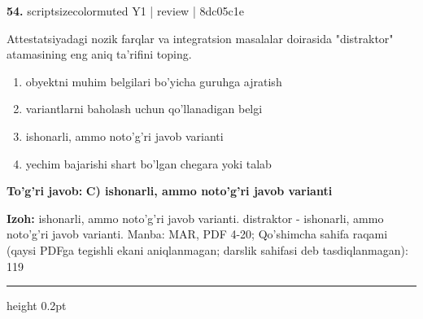 \documentclass[10pt,a4paper]{article}
\begin{document}
{\bfseries\sffamily\color{ink} 54.} {scriptsizecolor{muted} Y1 | review | 8dc05c1e}
\par
Attestatsiyadagi nozik farqlar va integratsion masalalar doirasida "distraktor" atamasining eng aniq ta'rifini toping.
\begin{enumerate}[label=\Alph*),leftmargin=9mm]
\item obyektni muhim belgilari bo'yicha guruhga ajratish
\item variantlarni baholash uchun qo'llanadigan belgi
\item ishonarli, ammo noto'g'ri javob varianti
\item yechim bajarishi shart bo'lgan chegara yoki talab
\end{enumerate}
\begin{tcolorbox}[enhanced,breakable,colback=teal!4,colframe=teal!60!black,boxrule=0.45pt,arc=1.2mm,left=2.7mm,right=2.7mm,top=1.8mm,bottom=1.8mm,before skip=2mm,after skip=2mm]
{\bfseries\sffamily\color{teal}To'g'ri javob:} \textbf{C) ishonarli, ammo noto'g'ri javob varianti}
\par\smallskip
{\bfseries Izoh:} ishonarli, ammo noto'g'ri javob varianti. distraktor - ishonarli, ammo noto'g'ri javob varianti. Manba: MAR, PDF 4-20; Qo'shimcha sahifa raqami (qaysi PDFga tegishli ekani aniqlanmagan; darslik sahifasi deb tasdiqlanmagan): 119
\end{tcolorbox}
\vspace{2mm}\hrule height 0.2pt\vspace{3mm}
\end{document}
